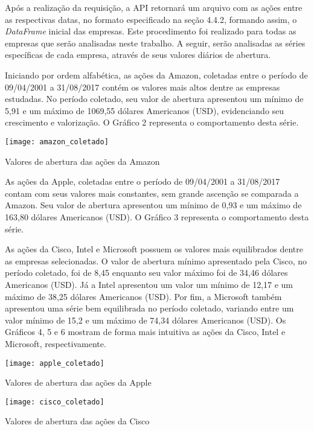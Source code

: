 Após a realização da requisição, a API retornará um arquivo com as ações entre as respectivas datas, no formato especificado na seção 4.4.2, formando assim, o \textit{DataFrame} inicial das empresas. Este procedimento foi realizado para todas as empresas que serão analisadas neste trabalho. A seguir, serão analisadas as séries específicas de cada empresa, através de seus valores diários de abertura.

Iniciando por ordem alfabética, as ações da Amazon, coletadas entre o período de 09/04/2001 a 31/08/2017 contém os valores mais altos dentre as empresas estudadas. No período coletado, seu valor de abertura apresentou um mínimo de 5,91 e um máximo de 1069,55 dólares Americanos (USD), evidenciando seu crescimento e valorização. O Gráfico 2 representa o comportamento desta série.
\begin{grafico}[h]
	\centering
	\centerline{\texttt{[image: amazon\_coletado]}}
	\caption{Valores de abertura das ações da Amazon}
	\label{exec-amazon-coleta}
\end{grafico}

As ações da Apple, coletadas entre o período de 09/04/2001 a 31/08/2017 contam com seus valores mais constantes, sem grande ascenção se comparada a Amazon. Seu valor de abertura apresentou um mínimo de 0,93 e um máximo de 163,80 dólares Americanos (USD). O Gráfico 3 representa o comportamento desta série.

As ações da Cisco, Intel e Microsoft possuem os valores mais equilibrados dentre as empresas selecionadas. O valor de abertura mínimo apresentado pela Cisco, no período coletado, foi de 8,45 enquanto seu valor máximo foi de 34,46 dólares Americanos (USD). Já a Intel apresentou um valor um mínimo de 12,17 e um máximo de 38,25 dólares Americanos (USD). Por fim, a Microsoft também apresentou uma série bem equilibrada no período coletado, variando entre um valor mínimo de 15,2 e um máximo de 74,34 dólares Americanos (USD). Os Gráficos 4, 5 e 6 mostram de forma mais intuitiva as ações da Cisco, Intel e Microsoft, respectivamente. 	
\begin{grafico}[h]
	\centering
	\centerline{\texttt{[image: apple\_coletado]}}
	\caption{Valores de abertura das ações da Apple}
	\label{exec-apple-coleta}
\end{grafico}

\begin{grafico}[h]
	\centering
	\centerline{\texttt{[image: cisco\_coletado]}}
	\caption{Valores de abertura das ações da Cisco}
	\label{exec-cisco-coleta}
\end{grafico}
 
